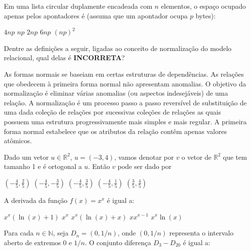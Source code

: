 \documentclass[12pt, addpoints]{exam}
\begin{document}
\begin{questions}
\question

Em uma lista circular duplamente encadeada com \( n \) elementos, o espaço ocupado apenas pelos apontadores é (assuma que um apontador ocupa \( p \) bytes):
\begin{choices}
\choice \( 4np \)
\choice \( np \)
\choice \( 2np \)
\choice \( 6np \)
\choice \( (np)^2 \)
\end{choices}

\question

Dentre as definições a seguir, ligadas ao conceito de normalização do modelo relacional, qual delas é \textbf{INCORRETA}?


\begin{choices}
\choice As formas normais se baseiam em certas estruturas de dependências.
\choice As relações que obedecem à primeira forma normal não apresentam anomalias.
\choice O objetivo da normalização é eliminar várias anomalias (ou aspectos indesejáveis) de uma relação.
\choice A normalização é um processo passo a passo reversível de substituição de uma dada coleção de relações por sucessivas coleções de relações as quais possuem uma estrutura progressivamente mais simples e mais regular.
\choice A primeira forma normal estabelece que os atributos da relação contêm apenas valores atômicos.
\end{choices}

\question

Dado um vetor \( u \in \mathbb{R}^2 \), \( u = (-3, 4) \), vamos denotar por \( v \) o vetor de \( \mathbb{R}^2 \) que tem tamanho 1 e é ortogonal a \( u \). Então \( v \) pode ser dado por


\begin{choices}
\choice \( \left( -\frac{4}{5}, \frac{2}{5} \right) \)
\choice \( \left( -\frac{4}{5}, -\frac{3}{5} \right) \)
\choice \( \left( -\frac{4}{5}, \frac{3}{5} \right) \)
\choice \( \left( -\frac{4}{5}, \frac{1}{5} \right) \)
\choice \( \left( \frac{3}{5}, \frac{4}{5} \right) \)
\end{choices}

\question

A derivada da função \( f(x) = x^x \) é igual a:
\begin{choices}
\choice \( x^x (\ln(x) + 1) \)
\choice \( x^x \)
\choice \( x^x (\ln(x) + x) \)
\choice \( x x^{x-1} \)
\choice \( x^x \ln(x) \)
\end{choices}

\question

Para cada \( n \in \mathbb{N} \), seja \( D_n = (0, 1/n) \), onde \( (0, 1/n) \) representa o intervalo aberto de extremos \( 0 \) e \( 1/n \). O conjunto diferença \( D_3 - D_{20} \) é igual a:



\end{questions}
\end{document}
